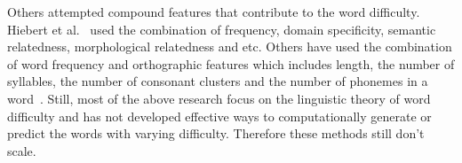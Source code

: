 Others attempted compound features that contribute to 
the word difficulty. 
Hiebert et al.~ used the combination of frequency, domain specificity, semantic relatedness, 
morphological relatedness and etc. 
Others have used  the combination of word frequency and orthographic features which includes length, the number of syllables, the number of consonant clusters and the number of phonemes in a word~\cite{koirala2015word,culligan2015comparison}.
Still, most of the above research focus on the linguistic theory of
word difficulty and has not developed 
effective ways to computationally generate or predict the 
words with varying difficulty.
Therefore these methods still don't scale. 

